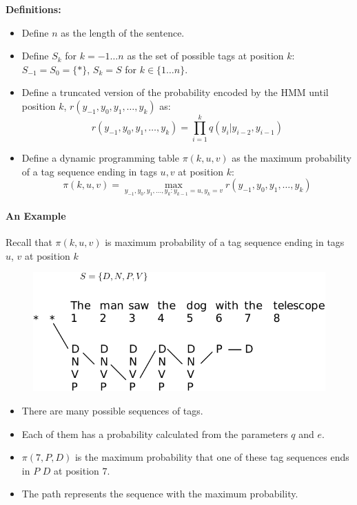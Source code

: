   \textbf{Definitions:}
  \begin{itemize}
    \item Define $n$ as the length of the sentence.
    \item Define $S_k$ for $k = -1 \ldots n$ as the set of possible tags at position $k$: $S_{-1} = S_0 = \{*\}$, $S_k = S$ for $k \in \{1 \ldots n\}$.
\item Define a truncated version of the probability encoded by the HMM until position $k$, $r(y_{-1}, y_0, y_1, \ldots, y_k)$ as:
  \[
    r(y_{-1}, y_0, y_1, \ldots, y_k) = \prod_{i=1}^{k} q(y_i | y_{i-2}, y_{i-1})
  \]
  
  \item Define a dynamic programming table $\pi(k, u, v)$ as the maximum probability of a tag sequence ending in tags $u, v$ at position $k$:
  \[
    \pi(k, u, v) = \max_{y_{-1}, y_0, y_1, \ldots, y_k : y_{k-1} = u, y_k = v} r(y_{-1}, y_0, y_1, \ldots, y_k)
  \]
  \end{itemize}

\paragraph{An Example}
Recall that   $\pi(k, u, v)$ is maximum probability of a tag sequence ending in tags $u$, $v$ at position $k$

  \begin{figure}[h]
        	\includegraphics[scale = 0.6]{pics/viterbi1.pdf}
        \end{figure}

\begin{itemize}
 \item There are many possible sequences of tags.
 \item Each of them has a probability calculated from the parameters $q$ and $e$.
 \item $\pi(7, P, D)$ is the maximum probability that one of these tag sequences ends in $P$ $D$ at position $7$.
 \item The path represents the sequence with the maximum probability.
\end{itemize}

